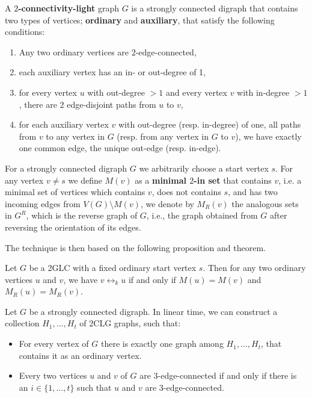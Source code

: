 \begin{definition}
    A \textbf{$2$-connectivity-light} graph $G$ is a strongly connected digraph that contains two types of vertices; \textbf{ordinary} and \textbf{auxiliary},
    that satisfy the following conditions:
    \begin{enumerate}
        \item Any two ordinary vertices are $2$-edge-connected,
        \item each auxiliary vertex has an in- or out-degree of 1,
        \item for every vertex $u$ with out-degree $>1$ and every vertex $v$ with in-degree $>1$, there are 2 edge-disjoint paths from $u$ to $v$,
        \item for each auxiliary vertex $v$ with out-degree (resp. in-degree) of one, all paths from $v$ to any vertex in $G$ (resp. from any vertex in $G$ to $v$),
        we have exactly one common edge, the unique out-edge (resp. in-edge).
    \end{enumerate}
\end{definition}

\begin{definition}
    For a strongly connected digraph $G$ we arbitrarily choose a start vertex $s$. For any vertex $v \neq s$ we define $M(v)$ as a \textbf{minimal $2$-in set} that contains $v$, i.e. a minimal set of vertices which contains $v$, does
    not contains $s$, and has two incoming edges from $V(G) \setminus M(v)$, we denote by $M_R(v)$ the analogous sets in $G^R$, which is the reverse graph of 
    $G$, i.e., the graph obtained from $G$ after reversing the orientation of its edges.
\end{definition}

The technique is then based on the following proposition and theorem.

\renewcommand{\theproposition}{I.3} 
\begin{proposition}
    Let $G$ be a 2GLC with a fixed ordinary start vertex $s$. Then for any two ordinary vertices $u$ and $v$, we have $v \leftrightarrow_k u$
    if and only if $M(u) = M(v)$ and $M_R(u) = M_R(v)$.
\end{proposition}
\renewcommand{\theproposition}{\arabic{proposition}}

\renewcommand{\thetheorem}{II.5} 
\begin{theorem}
    Let $G$ be a strongly connected digraph. In linear time, we can construct a collection $H_1, ..., H_t$ of 2CLG graphs, such that:
    \begin{itemize}
        \item For every vertex of $G$ there is exactly one graph among $H_1,..., H_t$, that contains it as an ordinary vertex.
        \item Every two vertices $u$ and $v$ of $G$ are $3$-edge-connected if and only if there is an $i \in \{1, ...,t\}$ such that $u$ and $v$
        are 3-edge-connected.
    \end{itemize}
\end{theorem}
\renewcommand{\thetheorem}{\arabic{theorem}}